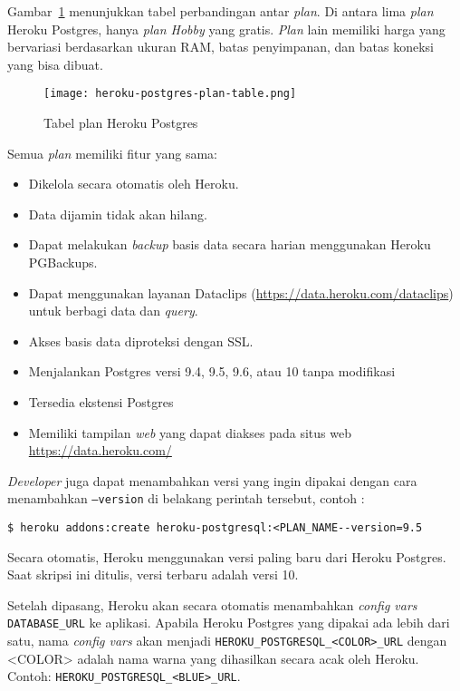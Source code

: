 Gambar~\ref{fig:heroku-postgres-plan-table} menunjukkan tabel perbandingan antar \textit{plan}. Di antara lima \textit{plan} Heroku Postgres, hanya \textit{plan Hobby} yang gratis. \textit{Plan} lain memiliki harga yang bervariasi berdasarkan ukuran RAM, batas penyimpanan, dan batas koneksi yang bisa dibuat.
\begin{figure}[H]
	\centering  
	\texttt{[image: heroku-postgres-plan-table.png]}  
	\caption[Tabel plan Heroku Postgres]{Tabel plan Heroku Postgres} 
	\label{fig:heroku-postgres-plan-table} 
\end{figure}

Semua \textit{plan} memiliki fitur yang sama:
\begin{itemize}
\item Dikelola secara otomatis oleh Heroku.
\item Data dijamin tidak akan hilang.
\item Dapat melakukan \textit{backup} basis data secara harian menggunakan Heroku PGBackups.
\item Dapat menggunakan layanan Dataclips (\url{https://data.heroku.com/dataclips}) untuk berbagi data dan \textit{query}.
\item Akses basis data diproteksi dengan SSL.
\item Menjalankan Postgres versi 9.4, 9.5, 9.6, atau 10 tanpa modifikasi
\item Tersedia ekstensi Postgres
\item Memiliki tampilan \textit{web} yang dapat diakses pada situs web \url{https://data.heroku.com/}
\end{itemize}

\textit{Developer} juga dapat menambahkan versi yang ingin dipakai dengan cara menambahkan \texttt{--version} di belakang perintah tersebut, contoh :
\begin{lstlisting}
$ heroku addons:create heroku-postgresql:<PLAN_NAME--version=9.5
\end{lstlisting}
Secara otomatis, Heroku menggunakan versi paling baru dari Heroku Postgres. Saat skripsi ini ditulis, versi terbaru adalah versi 10.

Setelah dipasang, Heroku akan secara otomatis menambahkan \textit{config vars} \texttt{DATABASE\_URL} ke aplikasi. Apabila Heroku Postgres yang dipakai ada lebih dari satu, nama \textit{config vars} akan menjadi \texttt{HEROKU\_POSTGRESQL\_<COLOR>\_URL} dengan <COLOR> adalah nama warna yang dihasilkan secara acak oleh Heroku. Contoh: \texttt{HEROKU\_POSTGRESQL\_<BLUE>\_URL}.

